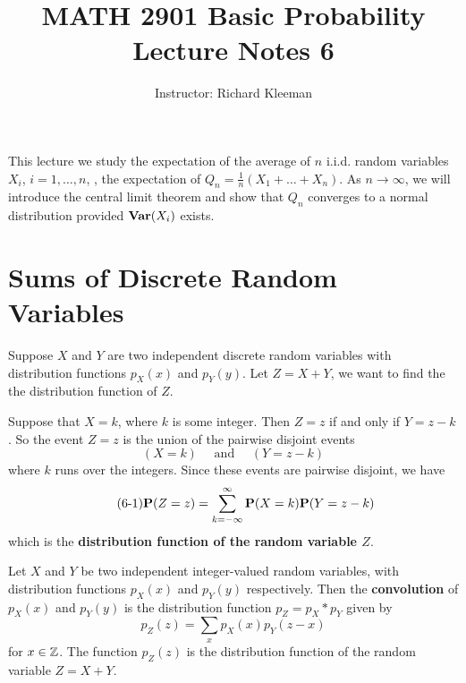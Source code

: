


\title{MATH 2901 Basic Probability Lecture Notes 6}
\author{Instructor: Richard Kleeman}
\date{}
\maketitle


This lecture we study the expectation of the average of $n$ i.i.d. random variables $X_i$, $i=1,\dots, n$, \ie, the expectation of $Q_n = \frac{1}{n} (X_1 + \dots + X_n)$. As $n \to \infty$, we will introduce the central limit theorem and show that $Q_n$ converges to a normal distribution provided $\mathbf{Var}(X_i)$ exists.


\section{Sums of Discrete Random Variables}
Suppose $X$ and $Y$ are two independent discrete random variables with distribution functions $p_X(x)$ and $p_Y(y)$. Let $Z = X + Y$, we want to find the the distribution function of $Z$. 

Suppose that $X = k$, where $k$ is some integer. Then $Z = z$ if and only if $Y = z-k$. So the event $Z = z$ is the union of the pairwise disjoint events
\begin{equation*}
    (X=k) \quad  \text { and } \quad  (Y=z-k)
\end{equation*}
where $k$ runs over the integers. Since these events are pairwise disjoint, we have
\begin{equation}
    \label{eq:6.1}
    \tag{6-1}
    \mathbf{P}(Z=z)=\sum_{k=-\infty}^{\infty} \mathbf{P}(X=k)  \mathbf{P}(Y=z-k)
\end{equation}
which is the \textbf{distribution function of the random variable $Z$}.

\begin{definition}
Let $X$ and $Y$ be two independent integer-valued random variables, with distribution functions $p_X(x)$ and $p_Y(y)$ respectively. Then the \textbf{convolution} of $p_X(x)$ and $p_Y(y)$ is the distribution function $p_Z = p_X * p_Y$ given by
\begin{equation*}
    p_Z(z) = \sum_{x} p_X(x) p_Y(z-x)
\end{equation*}
for $x\in \mathbb{Z}$. The function $p_Z(z)$ is the distribution function of the random variable $Z = X + Y$.
\end{definition}


